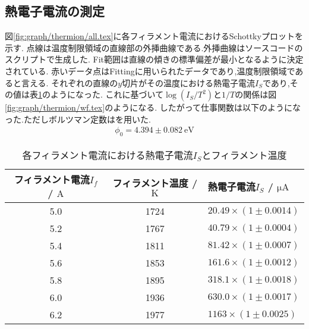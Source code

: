 \subsection{熱電子電流の測定}
図\ref{fig:graph/thermion/all.tex}に各フィラメント電流におけるSchottkyプロットを示す.
点線は温度制限領域の直線部の外挿曲線である.外挿曲線はソースコードのスクリプトで生成した.
Fit範囲は直線の傾きの標準偏差が最小となるように決定されている.
赤いデータ点はFittingに用いられたデータであり,温度制限領域であると言える.
それぞれの直線の$y$切片がその温度における熱電子電流$I_S$であり,その値は表\ref{tab:is}のようになった.
これに基づいて$\log(I_S/T^2)$と$1/T$の関係は図\ref{fig:graph/thermion/wf.tex}のようになる.
したがって仕事関数は以下のようになった.ただしボルツマン定数は\cite{rika44:online}を用いた.
\begin{align}
  \phi_0=4.394\pm0.082\ \si{\electronvolt}
\end{align}
\begin{table}[h]
\caption{各フィラメント電流における熱電子電流$I_S$とフィラメント温度}
\label{tab:is}
\centering
\begin{tabular}{ccl}
\hline
フィラメント電流$I_f$ / $\si{\ampere}$&フィラメント温度 / $\si{\kelvin}$&熱電子電流$I_S$ / $\si{\micro\ampere}$\\
\hline \hline
5.0 & 1724 &  $20.49\times(1\pm 0.0014)$ \\
5.2 & 1767 &  $40.79\times(1\pm 0.0004)$ \\
5.4 & 1811 &  $81.42\times(1\pm 0.0007)$ \\
5.6 & 1853 &  $161.6\times(1\pm 0.0012)$ \\ 
5.8 & 1895 &  $318.1\times(1\pm 0.0018)$ \\ 
6.0 & 1936 &  $630.0\times(1\pm 0.0017)$ \\ 
6.2 & 1977 &  $1163 \times(1\pm 0.0025)$ \\  
\hline
\end{tabular}
\end{table}
\newpage
